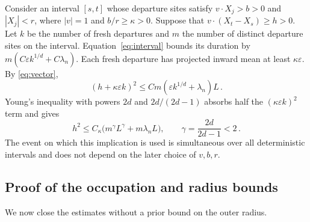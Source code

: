 \documentclass[11pt]{amsart}
\theoremstyle{plain}
\theoremstyle{definition}
\newcommand{\eps}{\varepsilon}
\begin{document}
Consider an interval $[s,t]$ whose departure sites satisfy
$v\cdot X_j>b>0$ and $|X_j|<r$, where $|v|=1$ and $b/r\geq\kappa>0$.
Suppose that $v\cdot(X_t-X_s)\geq h>0$.
Let $k$ be the number of fresh departures and $m$ the number of
distinct departure sites on the interval.
Equation~\eqref{eq:interval} bounds its duration by
$m(C\eps k^{1/d}+C\lambda_n)$.
Each fresh departure has projected inward mean at least $\kappa\eps$.
By \eqref{eq:vector},
\begin{equation}\label{eq:crossing-before-young}
(h+\kappa\eps k)^2\leq Cm(\eps k^{1/d}+\lambda_n)L\, .
\end{equation}
Young's inequality with powers $2d$ and $2d/(2d-1)$ absorbs half
the $(\kappa\eps k)^2$ term and gives
\begin{equation}\label{eq:crossing}
h^2\leq C_\kappa\bigl(m^\gamma L^\gamma+m\lambda_nL\bigr) ,
\qquad\gamma=\frac{2d}{2d-1}<2\, .
\end{equation}
The event on which this implication is used is simultaneous over
all deterministic intervals and does not depend on the later choice
of $v,b,r$.

\subsection{Proof of the occupation and radius bounds}
We now close the estimates without a prior bound on the outer radius.
\end{document}
